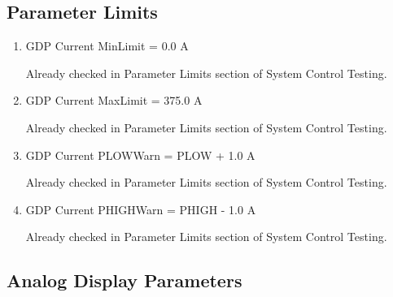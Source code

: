 \documentclass[11pt]{book}		%
\begin{document}
\subsection{Parameter Limits}

\begin{enumerate}
 \item GDP Current MinLimit = 0.0 A

\color{red}
Already checked in Parameter Limits section of System Control Testing.
\color{black}

 \item GDP Current MaxLimit = 375.0 A

\color{red}
Already checked in Parameter Limits section of System Control Testing.
\color{black}

 \item GDP Current PLOWWarn = PLOW + 1.0 A

\color{red}
Already checked in Parameter Limits section of System Control Testing.
\color{black}

 \item GDP Current PHIGHWarn = PHIGH - 1.0 A

\color{red}
Already checked in Parameter Limits section of System Control Testing.
\color{black}

\end{enumerate}

\subsection{Analog Display Parameters}
\end{document}
